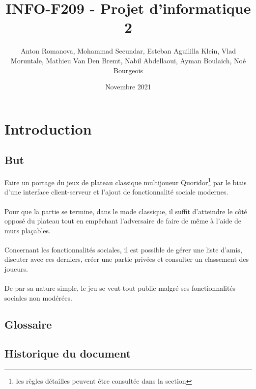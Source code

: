 \documentclass[french, utf8]{article}
\title{INFO-F209 - Projet d'informatique 2 }
\author{Anton Romanova, Mohammad Secundar, Esteban Aguililla Klein, Vlad Moruntale, Mathieu Van Den Bremt, Nabil Abdellaoui, Ayman Boulaich, Noé Bourgeois}
\date{Novembre 2021}
\begin{document}
\maketitle
\tableofcontents
\newpage


\section{Introduction}
\subsection{But}
Faire un portage du jeux de plateau classique multijoueur Quoridor\footnote{les règles détailles peuvent être consultée dans la section } par le biais d'une interface client-serveur et l'ajout de fonctionnalité sociale modernes.
\\ \\
Pour que la partie se termine, dans le mode classique, il suffit d'atteindre le côté opposé du plateau tout en empêchant l'adversaire de faire de même à l'aide de murs plaçables.    %
\\ \\
Concernant les fonctionnalités sociales, il est possible de gérer une liste d'amis, discuter avec ces derniers, créer une partie privées et consulter un classement des joueurs.
\\ \\
De par sa nature simple, le jeu se veut tout public malgré ses fonctionnalités sociales non modérées.  %

\subsection{Glossaire}

\printglossary

\subsection{Historique du document}
\end{document}

